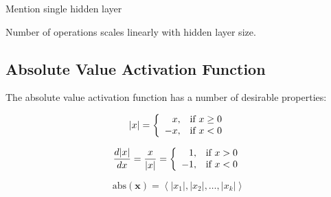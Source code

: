 \documentclass{article}
\begin{document}



Mention single hidden layer

Number of operations scales linearly with hidden layer size.


\subsection{Absolute Value Activation Function}

The absolute value activation function has a number of desirable properties: 

\begin{equation}
|x| =
\left\{
	\begin{array}{ll}
		\hfill x,  & \mbox{if } x \geq 0 \\
		-x, & \mbox{if } x < 0
	\end{array}
\right.
\end{equation}

\begin{equation}
\frac{d|x|}{dx} =
\frac{x}{|x|} =
\left\{
	\begin{array}{ll}
		\hfill 1,  & \mbox{if } x > 0 \\
		-1, & \mbox{if } x < 0
	\end{array}
\right.
\end{equation}


\begin{equation}
\textrm{abs}(\mathbf{x}) = \left \langle |x_1|, |x_2|, \dots , |x_k| \right \rangle
\end{equation}

\end{document}
